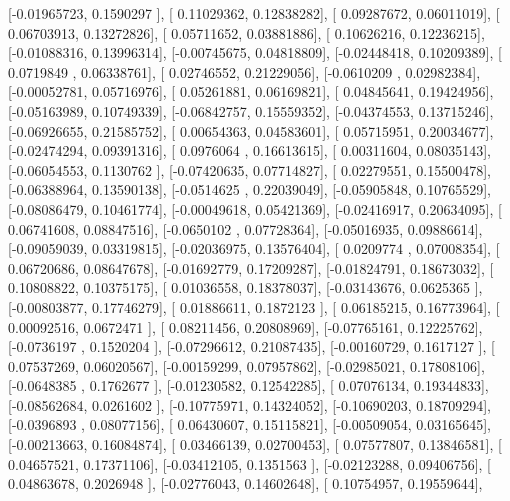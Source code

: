 \documentclass{article}
\begin{document}
       [-0.01965723,  0.1590297 ],
       [ 0.11029362,  0.12838282],
       [ 0.09287672,  0.06011019],
       [ 0.06703913,  0.13272826],
       [ 0.05711652,  0.03881886],
       [ 0.10626216,  0.12236215],
       [-0.01088316,  0.13996314],
       [-0.00745675,  0.04818809],
       [-0.02448418,  0.10209389],
       [ 0.0719849 ,  0.06338761],
       [ 0.02746552,  0.21229056],
       [-0.0610209 ,  0.02982384],
       [-0.00052781,  0.05716976],
       [ 0.05261881,  0.06169821],
       [ 0.04845641,  0.19424956],
       [-0.05163989,  0.10749339],
       [-0.06842757,  0.15559352],
       [-0.04374553,  0.13715246],
       [-0.06926655,  0.21585752],
       [ 0.00654363,  0.04583601],
       [ 0.05715951,  0.20034677],
       [-0.02474294,  0.09391316],
       [ 0.0976064 ,  0.16613615],
       [ 0.00311604,  0.08035143],
       [-0.06054553,  0.1130762 ],
       [-0.07420635,  0.07714827],
       [ 0.02279551,  0.15500478],
       [-0.06388964,  0.13590138],
       [-0.0514625 ,  0.22039049],
       [-0.05905848,  0.10765529],
       [-0.08086479,  0.10461774],
       [-0.00049618,  0.05421369],
       [-0.02416917,  0.20634095],
       [ 0.06741608,  0.08847516],
       [-0.0650102 ,  0.07728364],
       [-0.05016935,  0.09886614],
       [-0.09059039,  0.03319815],
       [-0.02036975,  0.13576404],
       [ 0.0209774 ,  0.07008354],
       [ 0.06720686,  0.08647678],
       [-0.01692779,  0.17209287],
       [-0.01824791,  0.18673032],
       [ 0.10808822,  0.10375175],
       [ 0.01036558,  0.18378037],
       [-0.03143676,  0.0625365 ],
       [-0.00803877,  0.17746279],
       [ 0.01886611,  0.1872123 ],
       [ 0.06185215,  0.16773964],
       [ 0.00092516,  0.0672471 ],
       [ 0.08211456,  0.20808969],
       [-0.07765161,  0.12225762],
       [-0.0736197 ,  0.1520204 ],
       [-0.07296612,  0.21087435],
       [-0.00160729,  0.1617127 ],
       [ 0.07537269,  0.06020567],
       [-0.00159299,  0.07957862],
       [-0.02985021,  0.17808106],
       [-0.0648385 ,  0.1762677 ],
       [-0.01230582,  0.12542285],
       [ 0.07076134,  0.19344833],
       [-0.08562684,  0.0261602 ],
       [-0.10775971,  0.14324052],
       [-0.10690203,  0.18709294],
       [-0.0396893 ,  0.08077156],
       [ 0.06430607,  0.15115821],
       [-0.00509054,  0.03165645],
       [-0.00213663,  0.16084874],
       [ 0.03466139,  0.02700453],
       [ 0.07577807,  0.13846581],
       [ 0.04657521,  0.17371106],
       [-0.03412105,  0.1351563 ],
       [-0.02123288,  0.09406756],
       [ 0.04863678,  0.2026948 ],
       [-0.02776043,  0.14602648],
       [ 0.10754957,  0.19559644],
\end{document}
